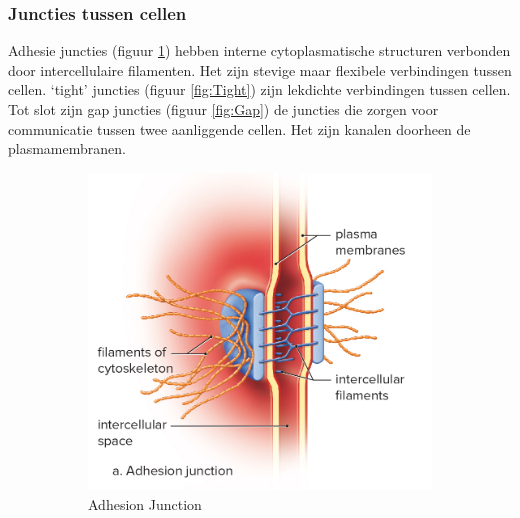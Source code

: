\documentclass[a4paper,kul]{kulakarticle} %
\begin{document}
\subsubsection{Juncties tussen cellen}
Adhesie juncties (figuur \ref{fig:Adhesie}) hebben interne cytoplasmatische structuren verbonden door intercellulaire filamenten. Het zijn stevige maar flexibele verbindingen tussen cellen. `tight' juncties (figuur \ref{fig:Tight}) zijn lekdichte verbindingen tussen cellen. Tot slot zijn gap juncties (figuur \ref{fig:Gap}) de juncties die zorgen voor communicatie tussen twee aanliggende cellen. Het zijn kanalen doorheen de plasmamembranen.   

\begin{figure}[h]
	\centering
	\begin{subfigure}{.33\textwidth}
		\centering
		\includegraphics[width=1\linewidth]{Adhesie_Junctie}
		\caption{Adhesion Junction}
		\label{fig:Adhesie}
	\end{subfigure}%
	\begin{subfigure}{.33\textwidth}
		\centering

\end{subfigure}
\end{figure}
\end{document}
